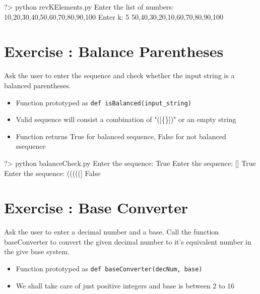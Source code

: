 \documentclass{42-en}
\begin{document}
		\begin{42console}
			?> python revKElements.py
			Enter the list of numbers: 10,20,30,40,50,60,70,80,90,100
			Enter k: 5
			50,40,30,20,10,60,70,80,90,100
		\end{42console}

\chapter{Exercise \exercicenumber: Balance Parentheses}

\exnumber{\exercicenumber}

\makeheaderfiles

Ask the user to enter the sequence and check whether the input string is a balanced parentheses.

		\begin{itemize}\itemsep1pt
			\item Function prototyped as \texttt{def isBalanced(input\_string)}
			\item Valid sequence will consist a combination of "([\{\}])" or an empty string
			\item Function returns True for balanced sequence, False for not balanced ssequence
        	\end{itemize}
	
		\begin{42console}
			?> python balanceCheck.py
			Enter the sequence:   
			True
			Enter the sequence: [{}]
			True
			Enter the sequence: (((((]
			False
		\end{42console}


\chapter{Exercise \exercicenumber: Base Converter}

\exnumber{\exercicenumber}

\makeheaderfiles

Ask the user to enter a decimal number and a base. Call the function baseConverter to convert the given decimal number to it's equivalent number in the give base system.

		\begin{itemize}\itemsep1pt
			\item Function prototyped as \texttt{def baseConverter(decNum, base)}
			\item We shall take care of just positive integers and base is between 2 to 16
        	\end{itemize}
	
\end{document}
